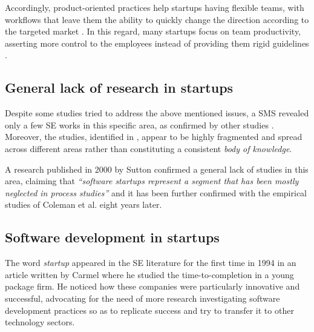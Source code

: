 \documentclass[10pt,journal,letterpaper,compsoc]{IEEEtran}
\begin{document}
Accordingly, product-oriented practices help startups having flexible teams, 
with workflows that leave them the ability to quickly change the direction 
according to the targeted market  \cite{Heitlager2007,Sutton2000}. In this 
regard, many startups focus on team productivity, asserting more control to the 
employees instead of providing them rigid guidelines \cite{Tanabian2005, 
Chorev2006, Kakati2003}. 

\subsection{General lack of research in startups}
Despite some studies tried to address the above mentioned issues, a SMS 
\cite{SMS} revealed only a few SE works in this specific area, as confirmed by 
other studies \cite{Coleman2008, Coleman2008a, Coleman2007, Sutton2000}. 
Moreover, the studies, identified in \cite{SMS}, appear to be highly fragmented 
and spread across different areas rather than constituting a consistent 
\textit{body of knowledge}.

A research published in 2000 by Sutton \cite{Sutton2000} confirmed a general 
lack of  studies in this area, claiming that \textit{``software startups 
represent a segment that has been mostly neglected in process studies''} and it 
has been further confirmed with the empirical studies of Coleman et al. 
\cite{Coleman2008,Coleman2008a,Coleman2007} eight years later.

\subsection{Software development in startups}

The word \textit{startup} appeared in the SE literature for the first time in 
1994 in an article written by Carmel \cite{Camel1994a} where he studied the 
time-to-completion in a young package firm. %
He noticed how these companies were particularly innovative and successful, 
advocating for the need of more research investigating software development 
practices so as to replicate success and try to transfer it to other technology 
sectors.
\end{document}
